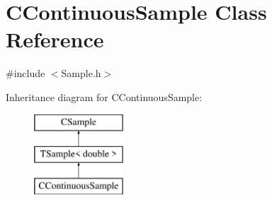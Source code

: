\hypertarget{class_c_continuous_sample}{\section{C\-Continuous\-Sample Class Reference}
\label{class_c_continuous_sample}
}


{\ttfamily \#include $<$Sample.\-h$>$}

Inheritance diagram for C\-Continuous\-Sample\-:\begin{figure}[H]
\begin{center}
\leavevmode
\includegraphics[height=3.000000cm]{class_c_continuous_sample}
\end{center}
\end{figure}
